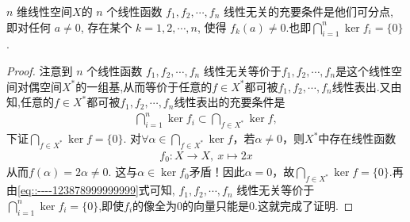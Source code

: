 \documentclass[../../main.tex]{subfiles}
\begin{document}
\begin{corollary}\label{corollary:对偶空间的基的充要条件}
\( n \) 维线性空间$X$的 \( n \) 个线性函数 \( f_1, f_2, \cdots, f_n \) 线性无关的充要条件是他们可分点, 即对任何 \( a \neq 0 \), 存在某个 \( k = 1, 2, \cdots, n \), 使得 \( f_k(a) \neq 0 \).也即\( \bigcap_{i=1}^n \ker f_i = \{0\} \).
\end{corollary}
\begin{proof}
注意到 \( n \) 个线性函数 \( f_1, f_2, \cdots, f_n \) 线性无关等价于\( f_1, f_2, \cdots, f_n \)是这个线性空间对偶空间$X^*$的一组基,从而等价于任意的$f\in X^*$都可被\( f_1, f_2, \cdots, f_n \)线性表出.又由知,任意的$f\in X^*$都可被\( f_1, f_2, \cdots, f_n \)线性表出的充要条件是
\begin{align}
\bigcap_{i=1}^n \ker f_i \subset \bigcap_{f \in X^*} \ker f,\label{eq::----123878999999999}
\end{align}
下证$\bigcap_{f \in X^*} \ker f = \{0\}$. 对$\forall \alpha \in \bigcap_{f \in X^*} \ker f$，若$\alpha \neq 0$，则$X^*$中存在线性函数
\begin{align*}
f_0: X \longrightarrow X,\ x \longmapsto 2x
\end{align*}
从而$f(\alpha) = 2\alpha \neq 0$. 这与$\alpha \in \ker f_0$矛盾！因此$\alpha = 0$，故$\bigcap_{f \in X^*} \ker f = \{0\}$.再由\eqref{eq::----123878999999999}式可知, \( f_1, f_2, \cdots, f_n \) 线性无关等价于 \( \bigcap_{i=1}^n \ker f_i = \{0\} \),即使$f_i$的像全为0的向量只能是0.这就完成了证明.

\end{proof}
\end{document}
